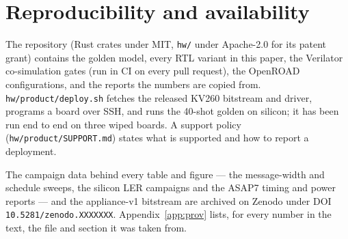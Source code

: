 \section{Reproducibility and availability}
\label{sec:repro}

The repository \citep{alephrepo} (Rust crates under MIT, \texttt{hw/} under Apache-2.0 for its patent
grant) contains the golden model, every RTL variant in this paper, the Verilator co-simulation gates
(run in CI on every pull request), the OpenROAD configurations, and the reports the numbers are
copied from. \texttt{hw/product/deploy.sh} fetches the released KV260 bitstream and driver, programs a
board over SSH, and runs the 40-shot golden on silicon; it has been run end to end on three wiped
boards. A support policy (\texttt{hw/product/SUPPORT.md}) states what is supported and how to report a
deployment.

The campaign data behind every table and figure --- the message-width and schedule sweeps, the
silicon LER campaigns and the ASAP7 timing and power reports --- and the appliance-v1 bitstream are
archived on Zenodo under DOI \texttt{10.5281/zenodo.XXXXXXX}. %
Appendix~\ref{app:prov} lists, for every number in the text, the file and section it was taken from.
